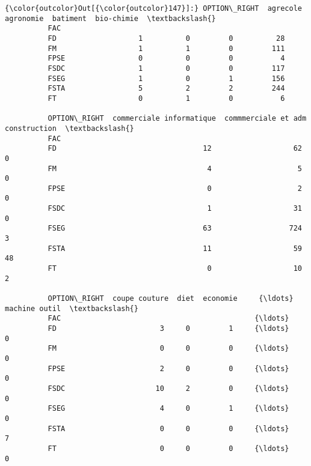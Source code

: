 \documentclass[11pt]{article}
\begin{document}
            \begin{Verbatim}[commandchars=\\\{\}]
{\color{outcolor}Out[{\color{outcolor}147}]:} OPTION\_RIGHT  agrecole  agronomie  batiment  bio-chimie  \textbackslash{}
          FAC                                                       
          FD                   1          0         0          28   
          FM                   1          1         0         111   
          FPSE                 0          0         0           4   
          FSDC                 1          0         0         117   
          FSEG                 1          0         1         156   
          FSTA                 5          2         2         244   
          FT                   0          1         0           6   
          
          OPTION\_RIGHT  commerciale informatique  commmerciale et adm  construction  \textbackslash{}
          FAC                                                                         
          FD                                  12                   62             0   
          FM                                   4                    5             0   
          FPSE                                 0                    2             0   
          FSDC                                 1                   31             0   
          FSEG                                63                  724             3   
          FSTA                                11                   59            48   
          FT                                   0                   10             2   
          
          OPTION\_RIGHT  coupe couture  diet  economie     {\ldots}       machine outil  \textbackslash{}
          FAC                                             {\ldots}                       
          FD                        3     0         1     {\ldots}                   0   
          FM                        0     0         0     {\ldots}                   0   
          FPSE                      2     0         0     {\ldots}                   0   
          FSDC                     10     2         0     {\ldots}                   0   
          FSEG                      4     0         1     {\ldots}                   0   
          FSTA                      0     0         0     {\ldots}                   7   
          FT                        0     0         0     {\ldots}                   0   
          

\end{Verbatim}
\end{document}
